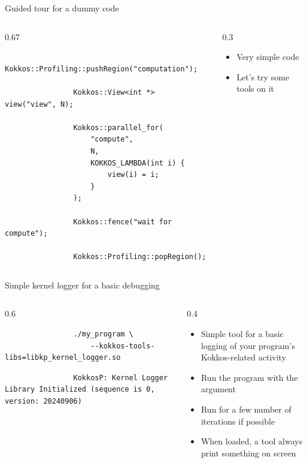 \documentclass[
    aspectratio=169,
    \createHandout
]{beamer}
\begin{document}
\begin{frame}[fragile]{Guided tour for a dummy code}
    \begin{columns}
        \begin{column}{0.67\linewidth}
            \begin{verbatim}
                Kokkos::Profiling::pushRegion("computation");

                Kokkos::View<int *> view("view", N);

                Kokkos::parallel_for(
                    "compute",
                    N,
                    KOKKOS_LAMBDA(int i) {
                        view(i) = i;
                    }
                );

                Kokkos::fence("wait for compute");

                Kokkos::Profiling::popRegion();
            \end{verbatim}
        \end{column}
        \begin{column}{0.3\linewidth}
            \begin{itemize}
                \item Very simple code
                \item Let's try some tools on it
            \end{itemize}
        \end{column}
    \end{columns}
\end{frame}

\begin{frame}[fragile]{Simple kernel logger for a basic debugging}
    \begin{columns}
        \begin{column}{0.6\linewidth}
            \begin{verbatim}
                ./my_program \
                    --kokkos-tools-libs=libkp_kernel_logger.so
            \end{verbatim}

            \begin{verbatim}
                KokkosP: Kernel Logger Library Initialized (sequence is 0, version: 20240906)
            \end{verbatim}
        \end{column}
        \begin{column}{0.4\linewidth}
            \begin{itemize}
                \item Simple tool for a basic logging of your program's Kokkos-related activity
                \item Run the program with the argument
                \item Run for a few number of iterations if possible
                \item When loaded, a tool always print something on screen
            \end{itemize}
        \end{column}
    \end{columns}
\end{frame}
\end{document}
